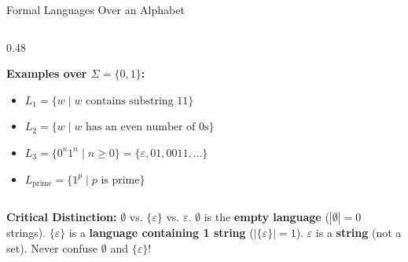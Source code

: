 \documentclass[aspectratio=169, 10pt]{beamer}
\newcommand{\greentitle}[1]{{\noindent\footnotesize\bfseries\color{accentGreen}#1}\par\vspace{0.03cm}}
\begin{document}
\begin{frame}{Formal Languages Over an Alphabet}
\begin{columns}[T]
\begin{column}{0.48\textwidth}
\begin{tcolorbox}[examplecard]
        \greentitle{Examples over $\Sigma = \{0, 1\}$:}
        \begin{itemize}\setlength{\itemsep}{1.5pt}\scriptsize
          \item $L_1 = \{w \mid w \text{ contains substring } 11\}$
          \item $L_2 = \{w \mid w \text{ has an even number of } 0\text{s}\}$
          \item $L_3 = \{0^n 1^n \mid n \ge 0\} = \{\varepsilon, 01, 0011, \dots\}$
          \item $L_{\text{prime}} = \{1^p \mid p \text{ is prime}\}$
        \end{itemize}
      \end{tcolorbox}
    \end{column}
  \end{columns}
  
  \vspace{0.10cm}
  \begin{tcolorbox}[alertcard]
    {\scriptsize\textbf{Critical Distinction:} $\emptyset$ vs. $\{\varepsilon\}$ vs. $\varepsilon$. 
    $\emptyset$ is the \textbf{empty language} ($|\emptyset| = 0$ strings). 
    $\{\varepsilon\}$ is a \textbf{language containing 1 string} ($|\{\varepsilon\}| = 1$). 
    $\varepsilon$ is a \textbf{string} (not a set). Never confuse $\emptyset$ and $\{\varepsilon\}$!}
  \end{tcolorbox}
\end{frame}
\end{document}
